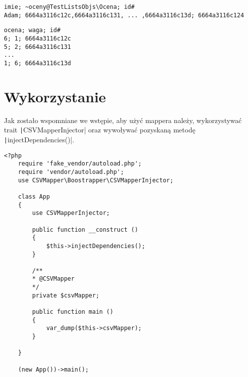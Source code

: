 \begin{empty}
	\begin{verbatim}
imie; ~oceny@TestListsObjs\Ocena; id#
Adam; 6664a3116c12c,6664a3116c131, ... ,6664a3116c13d; 6664a3116c124
	\end{verbatim}
	\vspace{-10pt}
\end{empty}
\vspace{10pt}
\begin{empty}
	\begin{verbatim}
ocena; waga; id#
6; 1; 6664a3116c12c
5; 2; 6664a3116c131
...
1; 6; 6664a3116c13d
	\end{verbatim}
	\vspace{-10pt}
\end{empty}

\section{Wykorzystanie}
Jak zostało wspomniane we wstępie, aby użyć mappera należy, wykorzystywać trait \texttt|CSVMapperInjector| oraz wywoływać pozyskaną metodę \texttt|injectDependencies()|.

\begin{empty}
	\begin{verbatim}
<?php
	require 'fake_vendor/autoload.php';
	require 'vendor/autoload.php';
	use CSVMapper\Boostrapper\CSVMapperInjector;
	
	class App 
	{
		use CSVMapperInjector;
		
		public function __construct ()
		{
			$this->injectDependencies();
		}
		
		/**
		* @CSVMapper
		*/
		private $csvMapper;
		
		public function main ()
		{
			var_dump($this->csvMapper);
		}
		
	}
	
	(new App())->main();
	\end{verbatim}
	\vspace{-10pt}
\end{empty}

